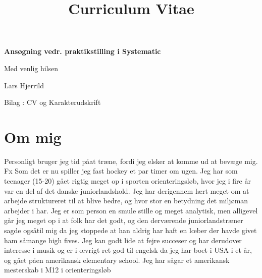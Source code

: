 \documentclass[11pt,a4paper,sans]{moderncv} %
\title{Curriculum Vitae}
\begin{document}


%
%
%
%
%

\textbf{Ans\o gning  vedr. praktikstilling i Systematic}



\vspace{3mm}
Med venlig hilsen

\vspace{5mm}
Lars Hjerrild



\vspace{8mm}
Bilag : CV og Karakterudskrift 







\newpage


\makecvtitle %


\section{Om mig}
Personligt bruger jeg tid p\aa at tr\ae ne, fordi jeg elsker at komme ud at bev\ae ge mig. Fx Som det er nu spiller jeg fast hockey et par timer om ugen. Jeg har som teenager (15-20) gået rigtig meget op i sporten orienteringsløb, hvor jeg i fire år var en del af det danske juniorlandshold. Jeg har derigennem lært meget om at arbejde struktureret til at blive bedre, og hvor stor en betydning det milj\o man arbejder i har. Jeg er som person en smule stille og meget analytisk, men alligevel g\aa r jeg meget op i at folk har det godt, og den derv\ae rende juniorlandstr\ae ner sagde ogs\aa til mig da jeg stoppede at han aldrig har haft en l\oe ber der havde givet ham s\aa mange high fives. Jeg kan godt lide at fejre succeser og har derudover interesse i musik og er i \oe vrigt ret god til engelsk da jeg har boet i USA i et \aa r, og g\aa et p\aa en amerikansk elementary school. Jeg har s\aa gar et amerikansk mesterskab i M12 i orienteringsl\o b 
\end{document}
